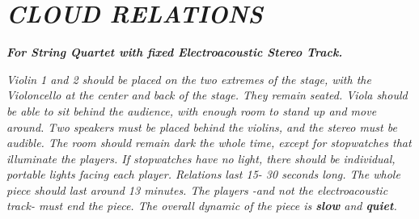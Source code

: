 \section{\texorpdfstring{\emph{CLOUD
RELATIONS}}{CLOUD RELATIONS}}\label{cloud-relations}

\emph{\textbf{For String Quartet with fixed Electroacoustic Stereo
Track.}}

\emph{Violin 1 and 2 should be placed on the two extremes of the stage,
with the Violoncello at the center and back of the stage. They remain
seated. Viola should be able to sit behind the audience, with enough
room to stand up and move around. Two speakers must be placed behind the
violins, and the stereo must be audible. The room should remain dark the
whole time, except for stopwatches that illuminate the players. If
stopwatches have no light, there should be individual, portable lights
facing each player. Relations last 15- 30 seconds long. The whole piece
should last around 13 minutes. The players -and not the electroacoustic
track- must end the piece. The overall dynamic of the piece is
\textbf{slow} and \textbf{quiet}.}

